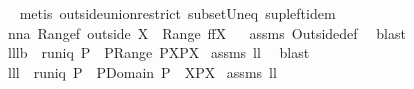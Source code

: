 \begin{isabellebody}
\isadelimproof
\ %
\endisadelimproof
%
\isatagproof
{}\isamarkupfalse%
\ {\isacharparenleft}metis\ outside{\isacharunderscore}union{\isacharunderscore}restrict\ subset{\isacharunderscore}Un{\isacharunderscore}eq\ sup{\isacharunderscore}left{\isacharunderscore}idem{\isacharparenright}%
\endisatagproof
{\isafoldproof}%
%
\isadelimproof
%
\endisadelimproof
\isanewline
\isanewline
{}\isamarkupfalse%
\ nn{}{}a{\isacharcolon}\ {\isachardoublequoteopen}Range{\isacharparenleft}f\ outside\ X{\isacharparenright}\ {\isasymsupseteq}\ {\isacharparenleft}Range\ f{\isacharparenright}{\isacharminus}{\isacharparenleft}f{\isacharbackquote}{\isacharbackquote}X{\isacharparenright}{\isachardoublequoteclose}%
\isadelimproof
\ %
\endisadelimproof
%
\isatagproof
{}\isamarkupfalse%
\ assms\ Outside{\isacharunderscore}def\ \isamarkupfalse%
\ blast%
\endisatagproof
{\isafoldproof}%
%
\isadelimproof
%
\endisadelimproof
\isanewline
\isanewline
{}\isamarkupfalse%
\ lll{}{}b{\isacharcolon}\ \ {\isachardoublequoteopen}runiq\ P{\isachardoublequoteclose}\ \ {\isachardoublequoteopen}P{\isasyminverse}{\isacharbackquote}{\isacharbackquote}{\isacharparenleft}{\isacharparenleft}Range\ P{\isacharparenright}{\isacharminus}X{\isacharparenright}{\isasyminter}{\isacharparenleft}{\isacharparenleft}P{\isasyminverse}{\isacharparenright}{\isacharbackquote}{\isacharbackquote}X{\isacharparenright}{\isacharequal}{\isacharbraceleft}{\isacharbraceright}{\isachardoublequoteclose}\isanewline
%
\isadelimproof
%
\endisadelimproof
%
\isatagproof
{}\isamarkupfalse%
\ assms\ ll{}{}\ \isamarkupfalse%
\ blast%
\endisatagproof
{\isafoldproof}%
%
\isadelimproof
\isanewline
%
\endisadelimproof
\isanewline
{}\isamarkupfalse%
\ lll{}{}{\isacharcolon}\ \ {\isachardoublequoteopen}runiq\ {\isacharparenleft}P{\isasyminverse}{\isacharparenright}{\isachardoublequoteclose}\ \ {\isachardoublequoteopen}P{\isacharbackquote}{\isacharbackquote}{\isacharparenleft}Domain\ P\ {\isacharminus}\ X{\isacharparenright}{\isasyminter}{\isacharparenleft}P{\isacharbackquote}{\isacharbackquote}X{\isacharparenright}{\isacharequal}{\isacharbraceleft}{\isacharbraceright}{\isachardoublequoteclose}\isanewline
%
\isadelimproof
%
\endisadelimproof
%
\isatagproof
{}\isamarkupfalse%
\ assms\ ll{}{}\ \isamarkupfalse%

\end{isabellebody}
